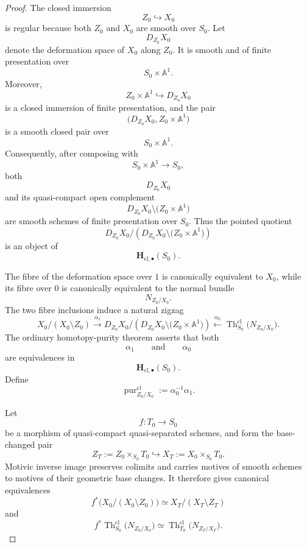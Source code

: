 \begin{proof}
The closed immersion
\[
    Z_0
    \hookrightarrow
    X_0
\]
is regular because both \(Z_0\) and \(X_0\) are smooth over \(S_0\).
Let
\[
    D_{Z_0}X_0
\]
denote the deformation space of \(X_0\) along \(Z_0\).  It is smooth
and of finite presentation over
\[
    S_0\times\mathbb A^1.
\]
Moreover,
\[
    Z_0\times\mathbb A^1
    \hookrightarrow
    D_{Z_0}X_0
\]
is a closed immersion of finite presentation, and the pair
\[
    \bigl(
        D_{Z_0}X_0,
        Z_0\times\mathbb A^1
    \bigr)
\]
is a smooth closed pair over
\[
    S_0\times\mathbb A^1.
\]
Consequently, after composing with
\[
    S_0\times\mathbb A^1
    \longrightarrow
    S_0,
\]
both
\[
    D_{Z_0}X_0
\]
and its quasi-compact open complement
\[
    D_{Z_0}X_0
    \setminus
    \bigl(
        Z_0\times\mathbb A^1
    \bigr)
\]
are smooth schemes of finite presentation over \(S_0\).  Thus the
pointed quotient
\[
    D_{Z_0}X_0/
    \left(
        D_{Z_0}X_0
        \setminus
        \bigl(
            Z_0\times\mathbb A^1
        \bigr)
    \right)
\]
is an object of
\[
    \mathbf H_{\mathrm{cl},\bullet}(S_0).
\]

The fibre of the deformation space over \(1\) is canonically
equivalent to \(X_0\), while its fibre over \(0\) is canonically
equivalent to the normal bundle
\[
    N_{Z_0/X_0}.
\]
The two fibre inclusions induce a natural zigzag
\[
    X_0/(X_0\setminus Z_0)
    \xrightarrow{\alpha_1}
    D_{Z_0}X_0/
    \left(
        D_{Z_0}X_0
        \setminus
        \bigl(
            Z_0\times\mathbb A^1
        \bigr)
    \right)
    \xleftarrow{\alpha_0}
    \operatorname{Th}^{\mathrm{cl}}_{S_0}
    \bigl(
        N_{Z_0/X_0}
    \bigr).
\]
The ordinary homotopy-purity theorem asserts that both
\[
    \alpha_1
    \qquad\text{and}\qquad
    \alpha_0
\]
are equivalences in
\[
    \mathbf H_{\mathrm{cl},\bullet}(S_0).
\]
Define
\[
    \operatorname{pur}^{\mathrm{cl}}_{Z_0/X_0}
    :=
    \alpha_0^{-1}\alpha_1.
\]

Let
\[
    f
    \colon
    T_0
    \longrightarrow
    S_0
\]
be a morphism of quasi-compact quasi-separated schemes, and form the
base-changed pair
\[
    Z_T
    :=
    Z_0\times_{S_0}T_0
    \hookrightarrow
    X_T
    :=
    X_0\times_{S_0}T_0.
\]
Motivic inverse image preserves colimits and carries motives of smooth
schemes to motives of their geometric base changes.  It therefore
gives canonical equivalences
\[
    f^*
    \bigl(
        X_0/(X_0\setminus Z_0)
    \bigr)
    \simeq
    X_T/(X_T\setminus Z_T)
\]
and
\[
    f^*
    \operatorname{Th}^{\mathrm{cl}}_{S_0}
    \bigl(
        N_{Z_0/X_0}
    \bigr)
    \simeq
    \operatorname{Th}^{\mathrm{cl}}_{T_0}
    \bigl(
        N_{Z_T/X_T}
    \bigr).
\]


\end{proof}
